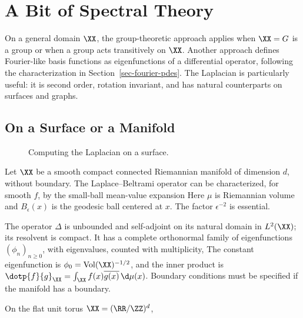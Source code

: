 \section{A Bit of Spectral Theory}

On a general domain $\XX$, the group-theoretic approach applies when $\XX=G$ is a group or when a group acts transitively on $\XX$. Another approach defines Fourier-like basis functions as eigenfunctions of a differential operator, following the characterization in Section~\ref{sec-fourier-pdes}. The Laplacian is particularly useful: it is second order, rotation invariant, and has natural counterparts on surfaces and graphs.


                                                
\subsection{On a Surface or a Manifold}

\begin{figure}[tbp]
\centering
{}
\caption{Computing the Laplacian on a surface.}
\label{fig-review-fourier-laplacian-surface}
\end{figure}
Let $\XX$ be a smooth compact connected Riemannian manifold of dimension $d$, without boundary. The Laplace--Beltrami operator can be characterized, for smooth $f$, by the small-ball mean-value expansion
Here $\mu$ is Riemannian volume and $B_\epsilon(x)$ is the geodesic ball centered at $x$. The factor $\epsilon^{-2}$ is essential.

The operator $\Delta$ is unbounded and self-adjoint on its natural domain in $L^2(\XX)$; its resolvent is compact. It has a complete orthonormal family of eigenfunctions $(\phi_n)_{n\geq0}$, with eigenvalues, counted with multiplicity,
The constant eigenfunction is $\phi_0=\mathrm{Vol}(\XX)^{-1/2}$, and the inner product is $\dotp{f}{g}_\XX=\int_\XX f(x)\overline{g(x)}\,\d\mu(x)$. Boundary conditions must be specified if the manifold has a boundary.

On the flat unit torus $\XX=(\RR/\ZZ)^d$,

